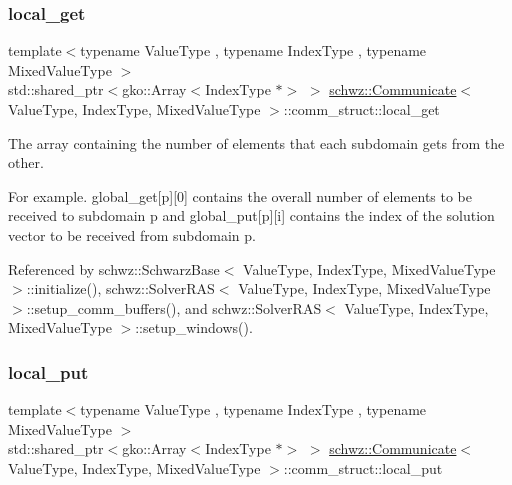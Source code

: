 \subsubsection{\texorpdfstring{local\+\_\+get}{local\_get}}
{\footnotesize\ttfamily template$<$typename Value\+Type , typename Index\+Type , typename Mixed\+Value\+Type $>$ \\
std\+::shared\+\_\+ptr$<$gko\+::\+Array$<$Index\+Type $\ast$$>$ $>$ \hyperlink{classschwz_1_1Communicate}{schwz\+::\+Communicate}$<$ Value\+Type, Index\+Type, Mixed\+Value\+Type $>$\+::comm\+\_\+struct\+::local\+\_\+get}



The array containing the number of elements that each subdomain gets from the other. 

For example. global\+\_\+get\mbox{[}p\mbox{]}\mbox{[}0\mbox{]} contains the overall number of elements to be received to subdomain p and global\+\_\+put\mbox{[}p\mbox{]}\mbox{[}i\mbox{]} contains the index of the solution vector to be received from subdomain p. 

Referenced by schwz\+::\+Schwarz\+Base$<$ Value\+Type, Index\+Type, Mixed\+Value\+Type $>$\+::initialize(), schwz\+::\+Solver\+R\+A\+S$<$ Value\+Type, Index\+Type, Mixed\+Value\+Type $>$\+::setup\+\_\+comm\+\_\+buffers(), and schwz\+::\+Solver\+R\+A\+S$<$ Value\+Type, Index\+Type, Mixed\+Value\+Type $>$\+::setup\+\_\+windows().

\mbox{\label{structschwz_1_1Communicate_1_1comm__struct_ace7588b81dd2aa7a84e118df8137252b}} 
\subsubsection{\texorpdfstring{local\+\_\+put}{local\_put}}
{\footnotesize\ttfamily template$<$typename Value\+Type , typename Index\+Type , typename Mixed\+Value\+Type $>$ \\
std\+::shared\+\_\+ptr$<$gko\+::\+Array$<$Index\+Type $\ast$$>$ $>$ \hyperlink{classschwz_1_1Communicate}{schwz\+::\+Communicate}$<$ Value\+Type, Index\+Type, Mixed\+Value\+Type $>$\+::comm\+\_\+struct\+::local\+\_\+put}



